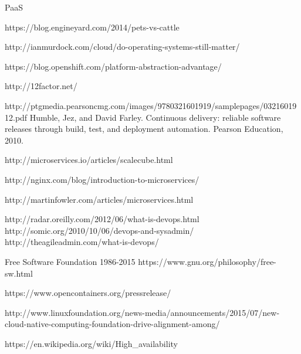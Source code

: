 \begin{thebibliography}{999}

%
%


PaaS

%
%

https://blog.engineyard.com/2014/pets-vs-cattle

http://ianmurdock.com/cloud/do-operating-systems-still-matter/

https://blog.openshift.com/platform-abstraction-advantage/

http://12factor.net/

http://ptgmedia.pearsoncmg.com/images/9780321601919/samplepages/0321601912.pdf
Humble, Jez, and David Farley. Continuous delivery: reliable software releases through build, test, and deployment automation. Pearson Education, 2010.


\item http://microservices.io/articles/scalecube.html
\item http://nginx.com/blog/introduction-to-microservices/
\item http://martinfowler.com/articles/microservices.html

  http://radar.oreilly.com/2012/06/what-is-devops.html
  http://somic.org/2010/10/06/devops-and-sysadmin/
  http://theagileadmin.com/what-is-devops/




Free Software Foundation
1986-2015
https://www.gnu.org/philosophy/free-sw.html

%
%

https://www.opencontainers.org/pressrelease/

%
%

http://www.linuxfoundation.org/news-media/announcements/2015/07/new-cloud-native-computing-foundation-drive-alignment-among/

%
%

%
%


%
%

https://en.wikipedia.org/wiki/High\_availability

\end{thebibliography}